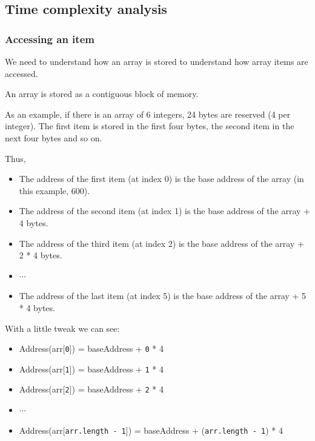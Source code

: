 \newpage

\subsection{Time complexity analysis}

\subsubsection{Accessing an item}

We need to understand how an array is stored to understand how array items are accessed.

An array is stored as a contiguous block of memory. 

As an example, if there is an array of 6 integers, 24 bytes are reserved (4 per integer). The first item is stored in the first four bytes, the second item in the next four bytes and so on.


Thus,
\begin{itemize}
  \item The address of the first item (at index 0) is the base address of the array (in this example, 600).
  \item The address of the second item (at index 1) is the base address of the array + 4 bytes.
  \item The address of the third item (at index 2) is the base address of the array + 2 * 4 bytes.
  \item $\cdots$  
  \item The address of the last item (at index 5) is the base address of the array + 5 * 4 bytes.
\end{itemize}

With a little tweak we can see:

\begin{itemize}
  \item Address(arr[\texttt{0}]) = baseAddress + \texttt{0} * 4
  \item Address(arr[\texttt{1}]) = baseAddress + \texttt{1} * 4
  \item Address(arr[\texttt{2}]) = baseAddress + \texttt{2} * 4
  \item $\cdots$  
  \item Address(arr[\texttt{arr.length - 1}]) = baseAddress + (\texttt{arr.length - 1}) * 4
\end{itemize}

